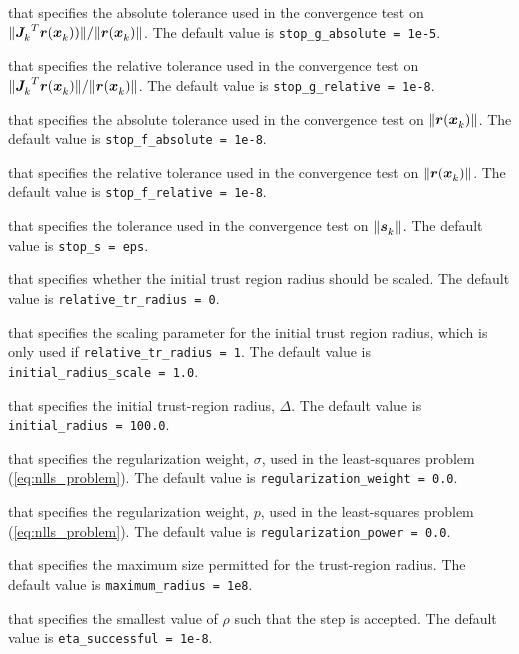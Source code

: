 \begin{description}
that specifies the absolute tolerance used in the convergence test on \(\|{{\bm J}_{k}^{}}^T{\bm r}({\bm x}_{k}^{}))\|/\|{\bm r}({\bm x}_{k}^{})\|\).
The default value is {\tt stop\_g\_absolute = 1e{-5}}.

that specifies the relative tolerance used in the convergence test on \(\|{{\bm J}_{k}^{}}^T{\bm r}({\bm x}_{k}^{})\|/\|{\bm r}({\bm x}_{k}^{})\|\).
The default value is {\tt stop\_g\_relative = 1e{-8}}.

that specifies the absolute tolerance used in the convergence test on \(\|{\bm r}({\bm x}_{k}^{})\|\).
The default value is {\tt stop\_f\_absolute = 1e{-8}}.

that specifies the relative tolerance used in the convergence test on \(\|{\bm r}({\bm x}_{k}^{})\|\).
The default value is {\tt stop\_f\_relative = 1e{-8}}.

that specifies the tolerance used in the convergence test on \(\|{\bm s}_{k}^{}\|\).
The default value is {\tt stop\_s = eps}.

that specifies whether the initial trust region radius should be scaled.
The default value is {\tt relative\_tr\_radius = 0}.

that specifies the scaling parameter for the initial trust region radius, which is only used if {\tt relative\_tr\_radius = 1}.
The default value is {\tt initial\_radius\_scale = 1.0}.

that specifies the initial trust-region radius, $\Delta$.
The default value is {\tt initial\_radius = 100.0}.

that specifies the regularization weight, $\sigma$, used in the least-squares problem (\ref{eq:nlls_problem}).
The default value is {\tt regularization\_weight = 0.0}.

that specifies the regularization weight, $p$, used in the least-squares problem (\ref{eq:nlls_problem}).
The default value is {\tt regularization\_power = 0.0}.


that specifies the maximum size permitted for the trust-region radius.
The default value is {\tt maximum\_radius = 1e8}.

that specifies the smallest value of $\rho$ such that the step is accepted.
The default value is {\tt eta\_successful = 1e-8}.


\end{description}
